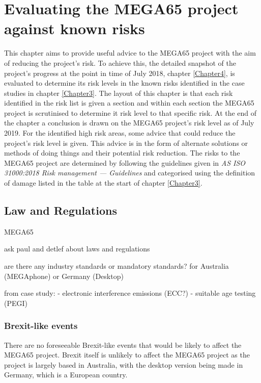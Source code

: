 %

\chapter{Evaluating the MEGA65 project against known risks}
\label{Chapter5}
This chapter aims to provide useful advice to the MEGA65 project with the aim of reducing the project's risk. To achieve this, the detailed snapshot of the project's progress at the point in time of July 2018, chapter \ref{Chapter4}, is evaluated to determine its risk levels in the known risks identified in the case studies in chapter \ref{Chapter3}. The layout of this chapter is that each risk identified in the risk list is given a section and within each section the MEGA65 project is scrutinised to determine it risk level to that specific risk. At the end of the chapter a conclusion is drawn on the MEGA65 project's risk level as of July 2019. For the identified high risk areas, some advice that could reduce the project's risk level is given. This advice is in the form of alternate solutions or methods of doing things and their potential risk reduction. The risks to the MEGA65 project are determined by following the guidelines given in \textit{AS ISO 31000:2018 Risk management — Guidelines} 
\cite{RN164} and categorised using the definition of damage listed in the table at the start of chapter \ref{Chapter3}.
\section{Law and Regulations}
MEGA65 

ask paul and detlef about laws and regulations

are there any industry standards or mandatory standards? for Australia (MEGAphone) or Germany (Desktop)

from case study:
- electronic interference emissions (ECC?)
- suitable age testing (PEGI)


\subsection{Brexit-like events}
There are no foreseeable Brexit-like events that would be likely to affect the MEGA65 project. Brexit itself is unlikely to affect the MEGA65 project as the project is largely based in Australia, with the desktop version being made in Germany, which is a European country. 

